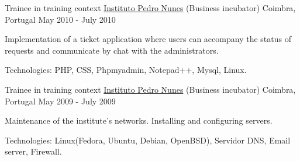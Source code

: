 \begin{cventries}

\cventry
{Trainee in training context} %
{\href{https://www.ipn.pt/}{Instituto Pedro Nunes} (Business incubator)} %
{Coimbra, Portugal} %
{May 2010 - July 2010} %
{ %
\begin{cvitems}
\item {Implementation of a ticket application where users can accompany the status of requests and communicate by chat with the administrators.}
\item{Technologies: PHP, CSS, Phpmyadmin, Notepad++, Mysql, Linux.}
\end{cvitems}
}


\cventry
{Trainee in training context} %
{\href{https://www.ipn.pt/}{Instituto Pedro Nunes} (Business incubator)} %
{Coimbra, Portugal} %
{May 2009 - July 2009} %
{ %
\begin{cvitems}
\item {Maintenance of the institute's networks. Installing and configuring servers.}
\item{Technologies: Linux(Fedora, Ubuntu, Debian, OpenBSD), Servidor DNS, Email server, Firewall.}
\end{cvitems}
}




\end{cventries}
